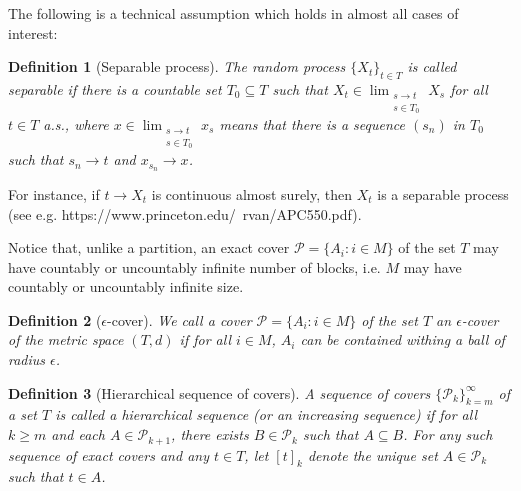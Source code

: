 \documentclass{article}
\newtheorem{definition}{Definition}
\newcommand{\pa}{\mathcal{P}}
\begin{document}
The following is a technical assumption which holds in almost all cases of interest:
\begin{definition} [Separable process] \label{Separable process}
The random process $\{X_t\}_{t\in T}$ is called \emph{separable} if there is a countable set $T_0\subseteq T$ such that $X_t\in \lim_{\substack{s\rightarrow t \\ s\in T_0}} X_s$ for all $t\in T$  a.s.,
where $x\in \lim_{\substack{s\rightarrow t \\ s\in T_0}} x_s$ means that there is a sequence $(s_n)$ in $T_0$ such that $s_n\rightarrow t$ and $x_{s_n}\rightarrow x$.
\end{definition}
For instance, if $t\to X_t$ is continuous almost surely, then $X_t$ is a separable process (see e.g. https://www.princeton.edu/~rvan/APC550.pdf). 

Notice that, unlike a partition, an exact cover $\pa=\{A_i: i\in M\}$ of the set $T$ may have countably or uncountably infinite number of blocks, i.e. $M$ may have countably or uncountably infinite size.
\begin{definition}[$\epsilon$-cover]\label{epsilon cover definition} We call a cover $\pa=\{A_i: i\in M\}$ of the set $T$ an \emph{$\epsilon$-cover} of the metric space $(T,d)$ if for all $i\in M$, $A_i$ can be contained withing a ball of radius $\epsilon$. 
\end{definition} 
\begin{definition}[Hierarchical sequence of covers]
	A sequence of covers $\{\pa_k\}_{k=m}^{\infty}$ of a set $T$ is called a \emph{hierarchical sequence} (or an \emph{increasing sequence}) if for all $k\geq m$ and each $A\in\pa_{k+1}$, there exists $B\in \pa_k$ such that $A\subseteq B$. For any such sequence of exact covers and any $t\in T$, let $[t]_k$ denote the unique set $A\in \pa_k$ such that $t\in A$.
\end{definition}
\end{document}
